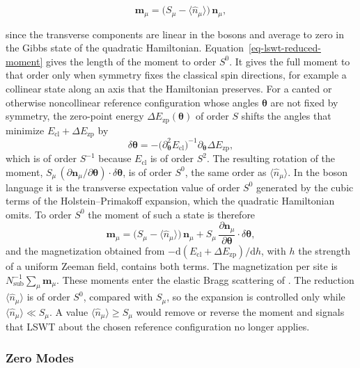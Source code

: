 \begin{equation}\label{eq-lswt-reduced-moment}
\mathbf m_\mu=\big(S_\mu-\langle\hat n_\mu\rangle\big)\,\mathbf n_\mu,
\end{equation}

since the transverse components are linear in the bosons and average to zero in the Gibbs state of the quadratic Hamiltonian. Equation~\eqref{eq-lswt-reduced-moment} gives the length of the moment to order \(S^0\). It gives the full moment to that order only when symmetry fixes the classical spin directions, for example a collinear state along an axis that the Hamiltonian preserves. For a canted or otherwise noncollinear reference configuration whose angles \(\boldsymbol\theta\) are not fixed by symmetry, the zero-point energy \(\Delta E_{\mathrm{zp}}(\boldsymbol\theta)\) of order \(S\) shifts the angles that minimize \(E_{\mathrm{cl}}+\Delta E_{\mathrm{zp}}\) by
\[
\delta\boldsymbol\theta=-\big(\partial_{\boldsymbol\theta}^2E_{\mathrm{cl}}\big)^{-1}\partial_{\boldsymbol\theta}\Delta E_{\mathrm{zp}},
\]
which is of order \(S^{-1}\) because \(E_{\mathrm{cl}}\) is of order \(S^2\). The resulting rotation of the moment, \(S_\mu\,(\partial\mathbf n_\mu/\partial\boldsymbol\theta)\cdot\delta\boldsymbol\theta\), is of order \(S^0\), the same order as \(\langle\hat n_\mu\rangle\). In the boson language it is the transverse expectation value of order \(S^0\) generated by the cubic terms of the Holstein--Primakoff expansion, which the quadratic Hamiltonian omits. To order \(S^0\) the moment of such a state is therefore
\[
\mathbf m_\mu=\big(S_\mu-\langle\hat n_\mu\rangle\big)\,\mathbf n_\mu+S_\mu\,\frac{\partial\mathbf n_\mu}{\partial\boldsymbol\theta}\cdot\delta\boldsymbol\theta,
\]
and the magnetization obtained from \(-\mathrm d(E_{\mathrm{cl}}+\Delta E_{\mathrm{zp}})/\mathrm dh\), with \(h\) the strength of a uniform Zeeman field, contains both terms. The magnetization per site is \(N_{\mathrm{sub}}^{-1}\sum_\mu\mathbf m_\mu\). These moments enter the elastic Bragg scattering of . The reduction \(\langle\hat n_\mu\rangle\) is of order \(S^0\), compared with \(S_\mu\), so the expansion is controlled only while \(\langle\hat n_\mu\rangle\ll S_\mu\). A value \(\langle\hat n_\mu\rangle\ge S_\mu\) would remove or reverse the moment and signals that LSWT about the chosen reference configuration no longer applies.

\subsubsection{Zero Modes}

